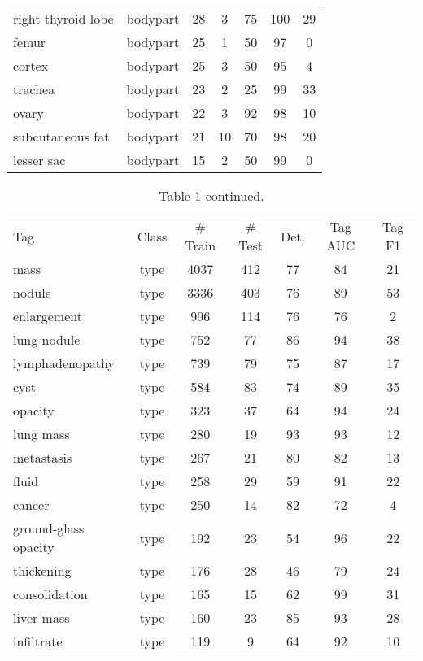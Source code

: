 \documentclass[runningheads]{llncs}
\begin{document}
\begin{table}[]
\begin{tabular}{p{3.6cm}cccccc}
		right thyroid lobe	&  bodypart	& 28	& 3	& 75	& 100	& 29 \\
		femur	&  bodypart	& 25	& 1	& 50	& 97	& 0 \\
		cortex	&  bodypart	& 25	& 3	& 50	& 95	& 4 \\
		trachea	&  bodypart	& 23	& 2	& 25	& 99	& 33 \\
		ovary	&  bodypart	& 22	& 3	& 92	& 98	& 10 \\
		subcutaneous fat	&  bodypart	& 21	& 10	& 70	& 98	& 20 \\
		lesser sac	&  bodypart	& 15	& 2	& 50	& 99	& 0 \\
		\hline
\end{tabular}

\label{tbl:acc_per_tag2}
\end{table}

\begin{table}[]
	\centering
	\scriptsize
	\setlength{\tabcolsep}{5pt}
	\renewcommand{\arraystretch}{1.2}
	\caption{Table \ref{tbl:acc_per_tag2} continued.}
	\begin{tabular}{p{3.6cm}cccccc}
		\hline
		Tag	& Class	& \# Train	& \# Test	& Det.	& Tag AUC	& Tag F1 \\
		mass	&  type	& 4037	& 412	& 77	& 84	& 21 \\
		nodule	&  type	& 3336	& 403	& 76	& 89	& 53 \\
		enlargement	&  type	& 996	& 114	& 76	& 76	& 2 \\
		lung nodule	&  type	& 752	& 77	& 86	& 94	& 38 \\
		lymphadenopathy	&  type	& 739	& 79	& 75	& 87	& 17 \\
		cyst	&  type	& 584	& 83	& 74	& 89	& 35 \\
		opacity	&  type	& 323	& 37	& 64	& 94	& 24 \\
		lung mass	&  type	& 280	& 19	& 93	& 93	& 12 \\
		metastasis	&  type	& 267	& 21	& 80	& 82	& 13 \\
		fluid	&  type	& 258	& 29	& 59	& 91	& 22 \\
		cancer	&  type	& 250	& 14	& 82	& 72	& 4 \\
		ground-glass opacity	&  type	& 192	& 23	& 54	& 96	& 22 \\
		thickening	&  type	& 176	& 28	& 46	& 79	& 24 \\
		consolidation	&  type	& 165	& 15	& 62	& 99	& 31 \\
		liver mass	&  type	& 160	& 23	& 85	& 93	& 28 \\
		infiltrate	&  type	& 119	& 9	& 64	& 92	& 10 \\

\end{tabular}
\end{table}
\end{document}
